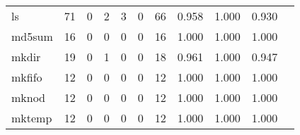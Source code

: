 \begin{longtable}{lp{1.2cm}p{1.2cm}p{1.2cm}p{1.2cm}p{1.2cm}p{1.2cm}p{1.2cm}p{1.2cm}p{1.2cm}p{1.2cm}}
ls        &                                    71 &                                                  0 &                                                  2 &                                                  3 &                                                  0 &                                                 66 &                                              0.958 &                                              1.000 &                                              0.930 \\
md5sum    &                                    16 &                                                  0 &                                                  0 &                                                  0 &                                                  0 &                                                 16 &                                              1.000 &                                              1.000 &                                              1.000 \\
mkdir     &                                    19 &                                                  0 &                                                  1 &                                                  0 &                                                  0 &                                                 18 &                                              0.961 &                                              1.000 &                                              0.947 \\
mkfifo    &                                    12 &                                                  0 &                                                  0 &                                                  0 &                                                  0 &                                                 12 &                                              1.000 &                                              1.000 &                                              1.000 \\
mknod     &                                    12 &                                                  0 &                                                  0 &                                                  0 &                                                  0 &                                                 12 &                                              1.000 &                                              1.000 &                                              1.000 \\
mktemp    &                                    12 &                                                  0 &                                                  0 &                                                  0 &                                                  0 &                                                 12 &                                              1.000 &                                              1.000 &                                              1.000 \\

\end{longtable}

